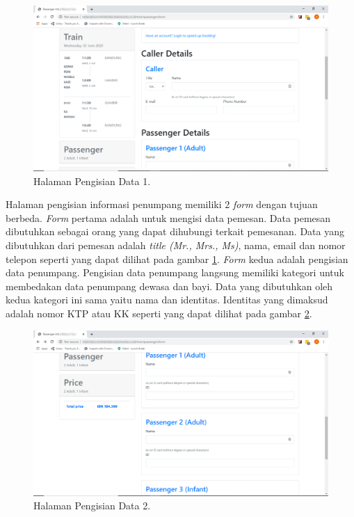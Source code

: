 \begin{figure}[H]
        \center
        \includegraphics[width=\textwidth,height=\textheight,keepaspectratio]{Gambar/Sidebar isi data 1.png}
        \caption{Halaman Pengisian Data 1.}
            \label{img:isidata1}
        \end{figure}
        
        
Halaman pengisian informasi penumpang memiliki 2 \textit{form} dengan tujuan berbeda. \textit{Form} pertama adalah untuk mengisi data pemesan. Data pemesan dibutuhkan sebagai orang yang dapat dihubungi terkait pemesanan. Data yang dibutuhkan dari pemesan adalah \textit{title (Mr., Mrs., Ms)}, nama, email dan nomor telepon seperti yang dapat dilihat pada gambar \ref{img:isidata1}. \textit{Form} kedua adalah pengisian data penumpang. Pengisian data penumpang langsung memiliki kategori untuk membedakan data penumpang dewasa dan bayi. Data yang dibutuhkan oleh kedua kategori ini sama yaitu nama dan identitas. Identitas yang dimaksud adalah nomor KTP atau KK  seperti yang dapat dilihat pada gambar \ref{img:isidata2}.

\begin{figure}[H]
        \center
        \includegraphics[width=\textwidth,height=\textheight,keepaspectratio]{Gambar/Sidebar isi data 2.png}
        \caption{Halaman Pengisian Data 2.}
            \label{img:isidata2}
        \end{figure}

